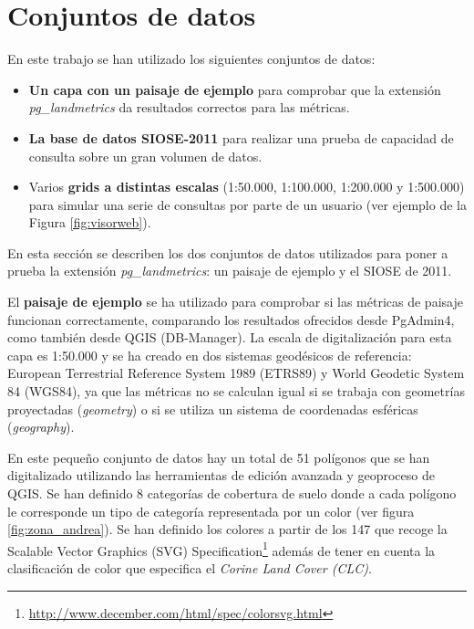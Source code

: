 \section{Conjuntos de datos\label{sec:datos}}

\begin{graybox}

En este trabajo se han utilizado los siguientes conjuntos de datos:

\begin{itemize}
\item \textbf{Un capa con un paisaje de ejemplo} para comprobar que la extensión \textit{pg\_landmetrics} da resultados correctos para las métricas.
\item \textbf{La base de datos SIOSE-2011} para realizar una prueba de capacidad de consulta sobre un gran volumen de datos.
\item Varios \textbf{grids a distintas escalas} (1:50.000, 1:100.000, 1:200.000 y 1:500.000) para simular una serie de consultas por parte de un usuario (ver ejemplo de la Figura \ref{fig:visorweb}).

\end{itemize}
\end{graybox}

En esta sección se describen los dos conjuntos de datos utilizados para poner a prueba la extensión \textit{pg\_landmetrics}: un paisaje de ejemplo y el SIOSE de 2011.

El \textbf{paisaje de ejemplo} se ha utilizado para comprobar si las métricas de paisaje funcionan correctamente, comparando los resultados ofrecidos desde PgAdmin4, como también desde QGIS (DB-Manager). La escala de digitalización para esta capa es 1:50.000 y se ha creado en dos sistemas geodésicos de referencia: European Terrestrial Reference System 1989 (ETRS89) y World Geodetic System 84 (WGS84), ya que las métricas no se calculan igual si se trabaja con geometrías proyectadas (\textit{geometry}) o si se utiliza un sistema de coordenadas esféricas (\textit{geography}). 

En este pequeño conjunto de datos hay un total de 51 polígonos que se han digitalizado utilizando las herramientas de edición avanzada y geoproceso de QGIS. Se han definido 8 categorías de cobertura de suelo donde a cada polígono le corresponde un tipo de categoría representada por un color (ver figura \ref{fig:zona_andrea}). Se han definido los colores a partir de los 147 que recoge la Scalable Vector Graphics (SVG) Specification\footnote{\url{http://www.december.com/html/spec/colorsvg.html}} además de tener en cuenta la clasificación de color que especifica el \textit{Corine Land Cover (CLC)}.

